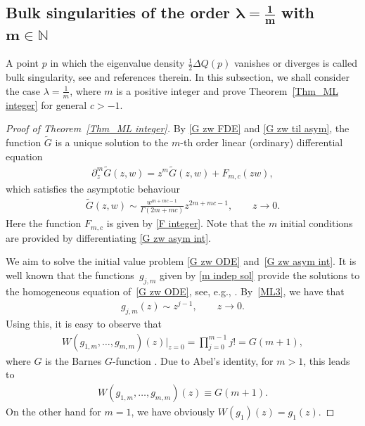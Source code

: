 \documentclass[pdftex]{sigma}
\numberwithin{equation}{section}
\newcommand{\1}{\chi}
\begin{document}
\subsection[Bulk singularities of the order lambda=1/m with m in N]{Bulk singularities of the order $\boldsymbol{\lambda=\frac1m}$ with $\boldsymbol{m\in \mathbb{N}}$}

A point $p$ in which the eigenvalue density $\frac12\Delta Q(p)$ vanishes or diverges is called bulk singularity, see \cite{ameur2018random} and references therein. In this subsection, we shall consider the case $\lambda=\frac1m$, where $m$ is a positive integer and prove Theorem~\ref{Thm_ML integer} for general $c>-1$.

\begin{proof}[Proof of Theorem~\ref{Thm_ML integer}]
	By \eqref{G zw FDE} and \eqref{G zw til asym}, the function $\widetilde{G}$ is a unique solution to the $m$-th order linear (ordinary) differential equation
	\begin{gather} \label{G zw ODE}
		\partial_z ^m \widetilde{G}(z,w)=z^m \widetilde{G}(z,w)+F_{m,c}(zw),
	\end{gather}
	which satisfies the asymptotic behaviour
	\begin{gather} \label{G zw asym int}
		\widetilde{G}(z,w) \sim \frac{w^{m+mc-1}}{ \Gamma(2m+mc) } z^{2m+mc-1},\qquad z \to 0.
	\end{gather}
	Here the function $F_{m,c}$ is given by \eqref{F integer}. Note that the $m$ initial conditions are provided by differentiating \eqref{G zw asym int}.
	
We aim to solve the initial value problem \eqref{G zw ODE} and~\eqref{G zw asym int}.
	It is well known that the functions~$g_{j,m}$ given by \eqref{m indep sol} provide the solutions to the homogeneous equation of~\eqref{G zw ODE}, see, e.g., \cite[Theorem~5.18]{gorenflo2014mittag}.
	By~\eqref{ML3}, we have that
	\begin{gather} \label{gj asymp}
		g_{j,m}(z) \sim z^{j-1} ,\qquad z \to 0.
	\end{gather}
	Using this, it is easy to observe that
	\begin{gather*}
		W(g_{1,m},\dots,g_{m,m})(z)|_{z=0}=\prod_{j=0}^{m-1} j!=G(m+1),
	\end{gather*}
	where $G$ is the Barnes $G$-function \cite[Section~5.17]{olver2010nist}. Due to Abel's identity, for $m>1$, this leads to
	\begin{gather} \label{Wronskian g1m}
		W(g_{1,m},\dots,g_{m,m})(z) \equiv G(m+1).
	\end{gather}
	On the other hand for $m=1$, we have obviously $W(g_1)(z)=g_1(z).$
	

\end{proof}
\end{document}

